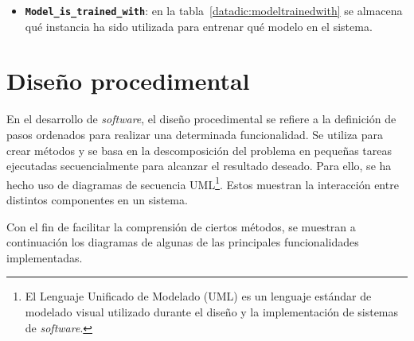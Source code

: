 \begin{itemize}
	\item \textbf{\texttt{Model\_is\_trained\_with}}: en la tabla~\ref{datadic:modeltrainedwith} se almacena qué instancia ha sido utilizada para entrenar qué modelo en el sistema.
	
		\begin{table}
		\caption[Diccionario de datos: \texttt{Model\_is\_trained\_with}]{Diccionario de datos: tabla correspondiente a la clase \texttt{Model\_is\_trained\_with}.}
		\label{datadic:modeltrainedwith}
	\end{table}
\end{itemize}


\section{Diseño procedimental}
\label{s:diseño-procedimental}

En el desarrollo de \textit{software}, el diseño procedimental se refiere a la definición de pasos ordenados para realizar una determinada funcionalidad. Se utiliza para crear métodos y se basa en la descomposición del problema en pequeñas tareas ejecutadas secuencialmente para alcanzar el resultado deseado. Para ello, se ha hecho uso de diagramas de secuencia UML\footnote{El Lenguaje Unificado de Modelado (UML) es un lenguaje estándar de modelado visual utilizado durante el diseño y la implementación de sistemas de \textit{software}.}. Estos muestran la interacción entre distintos componentes en un sistema.

Con el fin de facilitar la comprensión de ciertos métodos, se muestran a continuación los diagramas de algunas de las principales funcionalidades implementadas.




